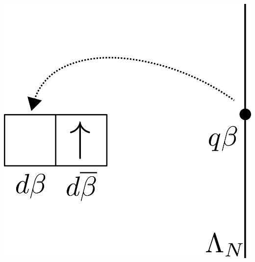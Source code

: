 \documentclass[14pt]{extarticle}
\numberwithin{equation}{section}
\begin{document}
\begin{minipage}{200pt}
\centering
\includegraphics[scale=0.3]{sc-h-2.png} 
\end{minipage}
\end{document}
